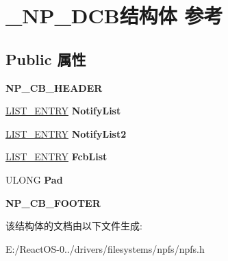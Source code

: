 \hypertarget{struct___n_p___d_c_b}{}\section{\+\_\+\+N\+P\+\_\+\+D\+C\+B结构体 参考}
\label{struct___n_p___d_c_b}
\subsection*{Public 属性}
\begin{DoxyCompactItemize}
\item 
\mbox{\label{struct___n_p___d_c_b_a93272d000247412ee9ea494b81cf5f9a}} 
{\bfseries N\+P\+\_\+\+C\+B\+\_\+\+H\+E\+A\+D\+ER}
\item 
\mbox{\label{struct___n_p___d_c_b_af44cec18f07321241f446104ed714049}} 
\hyperlink{struct___l_i_s_t___e_n_t_r_y}{L\+I\+S\+T\+\_\+\+E\+N\+T\+RY} {\bfseries Notify\+List}
\item 
\mbox{\label{struct___n_p___d_c_b_a2ef60678052ead014ce5e079742892b5}} 
\hyperlink{struct___l_i_s_t___e_n_t_r_y}{L\+I\+S\+T\+\_\+\+E\+N\+T\+RY} {\bfseries Notify\+List2}
\item 
\mbox{\label{struct___n_p___d_c_b_a88fb874583904cfaab7640693b88ea94}} 
\hyperlink{struct___l_i_s_t___e_n_t_r_y}{L\+I\+S\+T\+\_\+\+E\+N\+T\+RY} {\bfseries Fcb\+List}
\item 
\mbox{\label{struct___n_p___d_c_b_a130710aaaa845711a4dfc35e55fc6c16}} 
U\+L\+O\+NG {\bfseries Pad}
\item 
\mbox{\label{struct___n_p___d_c_b_a3710aff6ba91bc038819d1e8af5bfb92}} 
{\bfseries N\+P\+\_\+\+C\+B\+\_\+\+F\+O\+O\+T\+ER}
\end{DoxyCompactItemize}


该结构体的文档由以下文件生成\+:\begin{DoxyCompactItemize}
\item 
E\+:/\+React\+O\+S-\/0../drivers/filesystems/npfs/npfs.\+h\end{DoxyCompactItemize}
